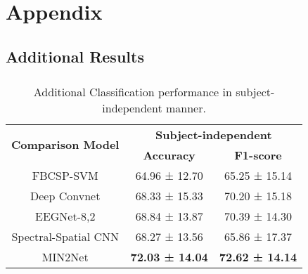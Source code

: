 \appendix
\chapter*{Appendix}


\section{Additional Results}

\paragraph{\lipsum[1-2]}

\begin{table}[ht]
\caption{Additional Classification performance in subject-independent manner.}
\label{appendix:table:results}
\centering
\small\singlespacingplus
    \begin{tabular}{@{}ccc@{}}
    \toprule
    \multirow{2}{*}{\textbf{Comparison Model}} & \multicolumn{2}{c}{\textbf{Subject-independent}} \\ \cmidrule(l){2-3} 
                                               & \textbf{Accuracy}       & \textbf{F1-score}      \\ \midrule
    FBCSP-SVM                                  & 64.96 ± 12.70           & 65.25 ± 15.14          \\
    Deep Convnet                               & 68.33 ± 15.33           & 70.20 ± 15.18          \\
    EEGNet-8,2                                 & 68.84 ± 13.87           & 70.39 ± 14.30          \\
    Spectral-Spatial CNN                       & 68.27 ± 13.56           & 65.86 ± 17.37          \\
    MIN2Net                                    & \textbf{72.03 ± 14.04}  & \textbf{72.62 ± 14.14} \\ \bottomrule
    \end{tabular}%
\end{table}



\paragraph{\lipsum[3-5]}